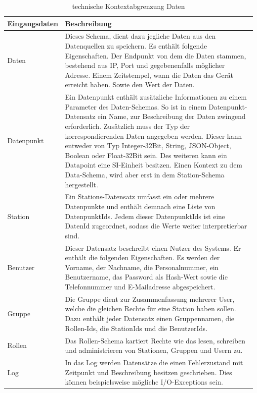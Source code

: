 \begin{table}[t]
	\begin{tabularx}{\textwidth}{|l|X|}
		\hline
		Eingangsdaten & Beschreibung\\
		\hline
		Daten & Dieses Schema, dient dazu jegliche Daten aus den Datenquellen zu speichern. Es enthält folgende Eigenschaften. Der Endpunkt von dem die Daten stammen, bestehend aus IP, Port und gegebenenfalls möglicher Adresse. Einem Zeitstempel, wann die Daten das Gerät erreicht haben. Sowie den Wert der Daten.\\
		\hline
		Datenpunkt & Ein Datenpunkt enthält zusätzliche Informationen zu einem Parameter des Daten-Schemas. So ist in einem Datenpunkt-Datensatz ein Name, zur Beschreibung der Daten zwingend erforderlich. Zusätzlich muss der Typ der korrespondierenden Daten angegeben werden. Dieser kann entweder von Typ Integer-32Bit, String, JSON-Object, Boolean oder Float-32Bit sein. Des weiteren kann ein Datapoint eine SI-Einheit besitzen. Einen Kontext zu dem Data-Schema, wird aber erst in dem Station-Schema hergestellt.\\
		\hline
		Station & Ein Stations-Datensatz umfasst ein oder mehrere Datenpunkte und enthält demnach eine Liste von DatenpunktIds. Jedem dieser DatenpunktIds ist eine DatenId zugeordnet, sodass die Werte weiter interpretierbar sind.\\
		\hline
		Benutzer & Dieser Datensatz beschreibt einen Nutzer des Systems. Er enthält die folgenden Eigenschaften. Es werden der Vorname, der Nachname, die Personalnummer, ein Benutzername, das Password als Hash-Wert sowie die Telefonnummer und E-Mailadresse abgespeichert.\\
		\hline
		Gruppe & Die Gruppe dient zur Zusammenfassung mehrerer User, welche die gleichen Rechte für eine Station haben sollen. Dazu enthält jeder Datensatz einen Gruppennamen, die Rollen-Ids, die  StationIds und die BenutzerIds.\\
		\hline
		Rollen & Das Rollen-Schema kartiert Rechte wie das lesen, schreiben und administrieren von Stationen, Gruppen und Usern zu.\\
		\hline
		Log & In das Log werden Datensätze die einen Fehlerzustand mit Zeitpunkt und Beschreibung besitzen geschrieben. Dies können beispielsweise mögliche I/O-Exceptions sein.\\
		\hline
	\end{tabularx} 
	\caption{technische Kontextabgrenzung Daten}
	\label{tab:technischeKontextabgrenzungDaten}
\end{table}
